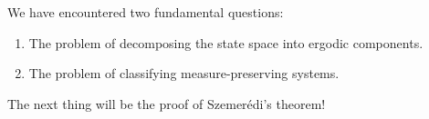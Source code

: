 \documentclass[11pt,a4paper]{article}
\begin{document}
We have encountered two fundamental questions:

\begin{enumerate}
 \setcounter{enumi}{0}\item The problem of decomposing the state space into ergodic components.
 \setcounter{enumi}{1}\item The problem of classifying measure-preserving systems.
\end{enumerate}
The next thing will be the proof of Szemer\'edi's theorem!
\end{document}
